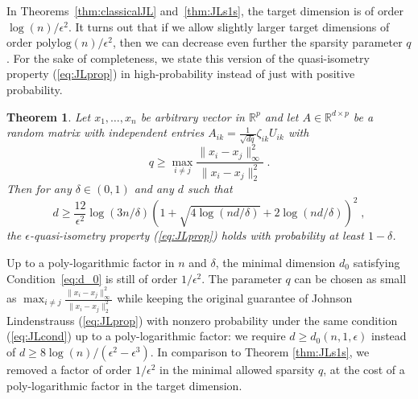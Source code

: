 \documentclass{ps}
\def\R{\mathbb{R}}
\newcommand{\1}{\mathbbm{1}}
\theoremstyle{plain}
\newtheorem{theorem}{Theorem}
\begin{document}
In Theorems~\ref{thm:classicalJL} and~\ref{thm:JLs1s}, the target dimension is of order $\log(n)/\epsilon^2$. It turns out that if we allow slightly larger target dimensions of order $\mathrm{polylog}(n)/\epsilon^2$, then we can decrease even further the sparsity parameter $q$. 
For the sake of completeness, we state this version of the quasi-isometry property (\ref{eq:JLprop}) in high-probability instead of just with positive probability. %
\begin{theorem}\label{th:jl_sparse}
	Let $x_1, \dots, x_n$ be arbitrary vector in $\R^p$ and let $A \in \R^{d \times p}$ be a random matrix with independent entries $A_{ik} = \frac{1}{\sqrt{dq}}\zeta_{ik} U_{ik}$  with
 \begin{equation}\label{eq:condition_q}
	q \geq \max_{i\neq j}\frac{\|x_i - x_j\|^2_{\infty}}{\|x_i - x_j\|_2^2} \; .
\end{equation}
Then for any $\delta \in (0,1)$ and any $d$ such that
\begin{equation}\label{eq:d_0}
	d \geq  \frac{12}{\epsilon^2} \log(3n/\delta) \left( 1 + \sqrt{4\log(nd/\delta)} + 2\log(nd/\delta) \right)^2 \; ,
\end{equation}
the $\epsilon$-quasi-isometry property (\ref{eq:JLprop}) holds with probability at least $1-\delta$.
\end{theorem}
Up to a poly-logarithmic factor in $n$ and $\delta$, the minimal dimension $d_0$ satisfying Condition~\eqref{eq:d_0} is still of order $1/\epsilon^2$. 
The parameter $q$ can be chosen as small as $\max_{i\neq j}\frac{\|x_i - x_j\|^2_{\infty}}{\|x_i - x_j\|_2^2}$ while keeping the original guarantee of Johnson Lindenstrauss (\ref{eq:JLprop}) with nonzero probability under the same condition (\ref{eq:JLcond}) up to a poly-logarithmic factor: we require $d \geq d_0(n, 1, \epsilon)$ instead of $d \geq 8\log(n)/(\epsilon^2 - \epsilon^3)$. In comparison to Theorem \ref{thm:JLs1s}, we removed a factor of order $1/\epsilon^2$ in the minimal allowed sparsity $q$, at the cost of a poly-logarithmic factor in the target dimension.
\end{document}
